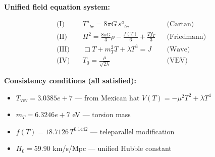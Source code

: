 
\textbf{Unified field equation system:}

\begin{align}
  \text{(I)} \quad & T^a{}_{bc} = 8\pi G \, s^a{}_{bc} && \text{(Cartan)} \\
  \text{(II)} \quad & H^2 = \frac{8\pi G}{3}\rho - \frac{f(T)}{6} + \frac{Tf_T}{3} && \text{(Friedmann)} \\
  \text{(III)} \quad & \Box T + m_T^2 T + \lambda T^3 = J && \text{(Wave)} \\
  \text{(IV)} \quad & T_0 = \frac{\mu}{\sqrt{2\lambda}} && \text{(VEV)}
\end{align}

\textbf{Consistency conditions (all satisfied):}
\begin{itemize}
  \item $T_{\text{vev}} = 3.0385e+7$ — from Mexican hat $V(T) = -\mu^2 T^2 + \lambda T^4$
  \item $m_T = 6.3246e+7$ eV — torsion mass
  \item $f(T) = 18.7126 \, T^{0.1442}$ — teleparallel modification
  \item $H_0 = 59.90$ km/s/Mpc — unified Hubble constant
\end{itemize}